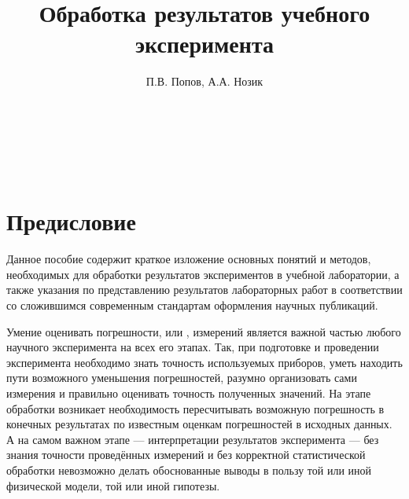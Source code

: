 \documentclass[a5paper,10pt,oneside]{report}
\begin{document}
\title{Обработка результатов учебного эксперимента}
\author{П.В. Попов, А.А. Нозик}

\maketitle

%    


\newpage

\ \\

\newpage

\ \\

\newpage

\tableofcontents


\newpage 

\chapter*{Предисловие}
    Данное пособие содержит краткое изложение основных понятий и методов, необходимых для обработки результатов экспериментов в учебной лаборатории, а также указания по представлению результатов лабораторных работ в соответствии со сложившимся современным стандартам оформления научных публикаций.

    Умение оценивать погрешности, или , измерений
    является важной частью любого научного эксперимента на всех его этапах.
    Так, при подготовке и проведении эксперимента необходимо знать точность
    используемых приборов, уметь находить пути возможного уменьшения погрешностей,
    разумно организовать сами измерения и правильно оценивать точность
    полученных значений. На этапе обработки возникает необходимость пересчитывать
    возможную погрешность в конечных результатах по известным оценкам погрешностей
    в исходных данных. А на самом важном этапе --- интерпретации
    результатов эксперимента --- без знания точности проведённых
    измерений и без корректной статистической обработки невозможно делать
    обоснованные выводы в пользу той или иной физической модели, той или
    иной гипотезы.
\end{document}
